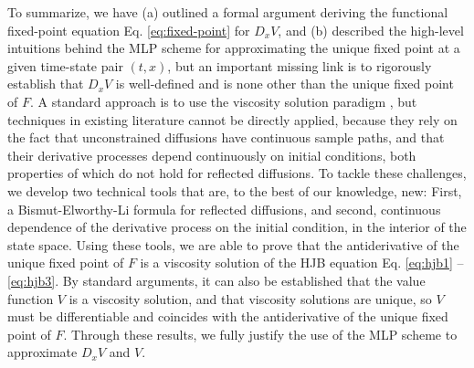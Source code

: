 \documentclass[11pt]{article}
\theoremstyle{definition}
\theoremstyle{plain}
\begin{document}
To summarize, we have (a) outlined a formal argument deriving the functional fixed-point equation Eq. \eqref{eq:fixed-point} for $D_x V$, 
and (b) described the high-level intuitions behind the MLP scheme for approximating the unique fixed point at a given time-state pair $(t,x)$, 
but an important missing link is to rigorously establish that $D_x V$ is well-defined and is none other than the unique fixed point of $F$.
A standard approach is to use the viscosity solution paradigm \cite{FlemingSoner2006,CrandallIshiiLions1992}, but techniques in existing literature cannot be directly applied, 
because they rely on the fact that unconstrained diffusions have continuous sample paths, and that their derivative processes depend continuously on initial conditions, 
both properties of which do not hold for reflected diffusions. 
To tackle these challenges, we develop two technical tools that are, to the best of our knowledge, new: 
First, a Bismut-Elworthy-Li formula for reflected diffusions, 
and second, continuous dependence of the derivative process on the initial condition, 
in the interior of the state space. 
Using these tools, we are able to prove that the antiderivative of the unique fixed point of $F$ 
is a viscosity solution of the HJB equation Eq. \eqref{eq:hjb1} -- \eqref{eq:hjb3}. 
By standard arguments, it can also be established that the value function $V$ is a viscosity solution, 
and that viscosity solutions are unique, so $V$ must be differentiable and coincides with the antiderivative of the unique fixed point of $F$.
Through these results, we fully justify the use of the MLP scheme to approximate $D_x V$ and $V$.
\end{document}
